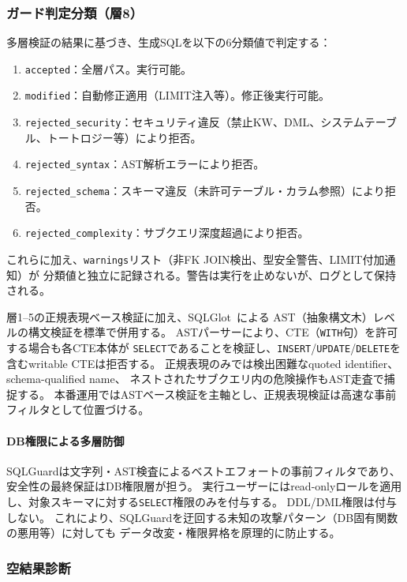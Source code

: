 \documentclass[5p,twocolumn]{elsarticle}
\begin{document}
\subsubsection{ガード判定分類（層8）}
\label{sec:guard_categories}

多層検証の結果に基づき、生成SQLを以下の6分類値で判定する：

\begin{enumerate}
  \item \texttt{accepted}：全層パス。実行可能。
  \item \texttt{modified}：自動修正適用（LIMIT注入等）。修正後実行可能。
  \item \texttt{rejected\_security}：セキュリティ違反（禁止KW、DML、システムテーブル、トートロジー等）により拒否。
  \item \texttt{rejected\_syntax}：AST解析エラーにより拒否。
  \item \texttt{rejected\_schema}：スキーマ違反（未許可テーブル・カラム参照）により拒否。
  \item \texttt{rejected\_complexity}：サブクエリ深度超過により拒否。
\end{enumerate}

これらに加え、\texttt{warnings}リスト（非FK JOIN検出、型安全警告、LIMIT付加通知）が
分類値と独立に記録される。警告は実行を止めないが、ログとして保持される。

層1--5の正規表現ベース検証に加え、SQLGlot~\citep{sqlglot2023}による
AST（抽象構文木）レベルの構文検証を標準で併用する。
ASTパーサーにより、CTE（\texttt{WITH}句）を許可する場合も各CTE本体が
\texttt{SELECT}であることを検証し、\texttt{INSERT}/\texttt{UPDATE}/\texttt{DELETE}を
含むwritable CTEは拒否する。
正規表現のみでは検出困難なquoted identifier、schema-qualified name、
ネストされたサブクエリ内の危険操作もAST走査で捕捉する。
本番運用ではASTベース検証を主軸とし、正規表現検証は高速な事前フィルタとして位置づける。

\paragraph{DB権限による多層防御}
SQLGuardは文字列・AST検査によるベストエフォートの事前フィルタであり、
安全性の最終保証はDB権限層が担う。
実行ユーザーにはread-onlyロールを適用し、対象スキーマに対する\texttt{SELECT}権限のみを付与する。
DDL/DML権限は付与しない。
これにより、SQLGuardを迂回する未知の攻撃パターン（DB固有関数の悪用等）に対しても
データ改変・権限昇格を原理的に防止する。

\subsubsection{空結果診断}
\label{sec:empty_diagnosis}
\end{document}
